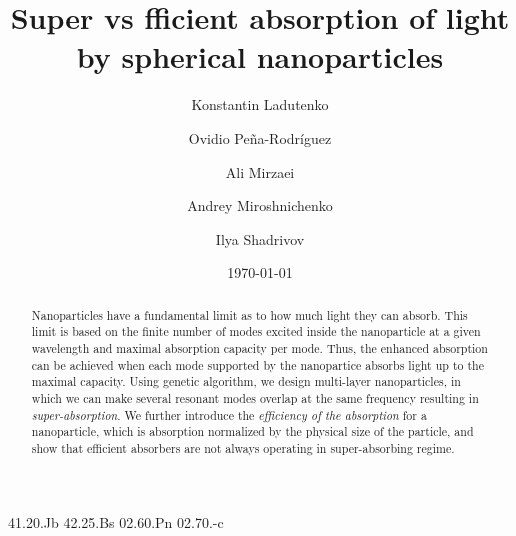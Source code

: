 \documentclass[aps,prl,twocolumn,showpacs,superscriptaddress,groupedaddress]{revtex4-1}
\begin{document}

\title{Super vs fficient absorption of light by spherical nanoparticles}


\author{Konstantin Ladutenko} 


\author{Ovidio Pe\~{n}a-Rodr\'{i}guez} 


\author{Ali Mirzaei} \author{Andrey Miroshnichenko} \author{Ilya
  Shadrivov} 

\date{\today}

\begin{abstract}
  Nanoparticles have a fundamental limit as to
  how much light they can absorb. This limit is based on the
  finite number of modes excited inside the nanoparticle at a given wavelength and maximal absorption capacity per mode. Thus, the enhanced absorption can be achieved when each mode supported by the nanopartice absorbs light up to the maximal capacity. Using genetic algorithm, we design multi-layer nanoparticles, in which we
  can make several resonant modes overlap at the same frequency resulting in {\it super-absorption}. 
  We further introduce the {\it efficiency of
  the absorption} for a nanoparticle, which is absorption normalized by
  the physical size of the particle, and show that efficient absorbers
  are not always operating in super-absorbing regime.
\end{abstract}


\pacs%
{41.20.Jb 42.25.Bs 02.60.Pn 02.70.-c}
\end{document}
